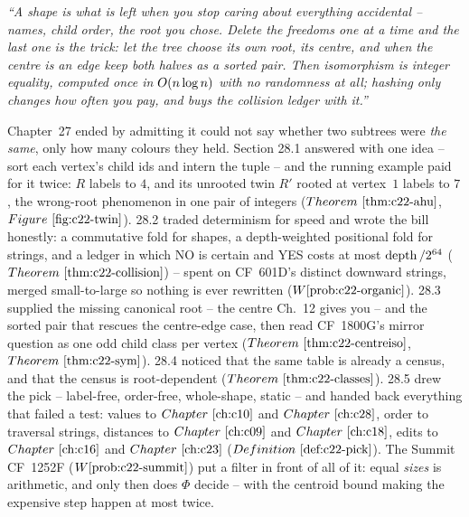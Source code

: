 \begin{lastword}
\emph{``A shape is what is left when you stop caring about everything accidental -- names,
child order, the root you chose. Delete the freedoms one at a time and the last one is the
trick: let the tree choose its own root, its centre, and when the centre is an edge keep
both halves as a sorted pair. Then isomorphism is integer equality, computed once in
\(O(n\log n)\) with no randomness at all; hashing only changes how often you pay, and
buys the collision ledger with it.''}

\medskip
Chapter~27 ended by admitting it could not say whether two subtrees were \emph{the same},
only how many colours they held. Section 28.1 answered with one idea -- sort each vertex's
child ids and intern the tuple -- and the running example paid for it twice: \(R\) labels to
\(4\), and its unrooted twin \(R'\) rooted at vertex~\(1\) labels to \(7\), the wrong-root
phenomenon in one pair of integers (\(\thmref{c22-ahu}\), \(\figref{c22-twin}\)). 28.2
traded determinism for speed and wrote the bill honestly: a commutative fold for shapes, a
depth-weighted positional fold for strings, and a ledger in which NO is certain and YES
costs at most \(\operatorname{depth}/2^{64}\) (\(\thmref{c22-collision}\)) -- spent on CF~601D's distinct
downward strings, merged small-to-large so nothing is ever rewritten
(\(\probref{c22-organic}\)). 28.3 supplied the missing canonical root -- the centre Ch.~12
gives you -- and the sorted pair that rescues the centre-edge case, then read CF~1800G's
mirror question as one odd child class per vertex (\(\thmref{c22-centreiso}\),
\(\thmref{c22-sym}\)). 28.4 noticed that the same table is already a census, and that the
census is root-dependent (\(\thmref{c22-classes}\)). 28.5 drew the pick -- label-free,
order-free, whole-shape, static -- and handed back everything that failed a test: values to
\(\chref{c10}\) and \(\chref{c28}\), order to traversal strings, distances to \(\chref{c09}\)
and \(\chref{c18}\), edits to \(\chref{c16}\) and \(\chref{c23}\) (\(\defref{c22-pick}\)).
The Summit CF~1252F (\(\probref{c22-summit}\)) put a filter in front of all of it: equal
\emph{sizes} is arithmetic, and only then does \(\Phi\) decide -- with the centroid bound
making the expensive step happen at most twice.


\end{lastword}
